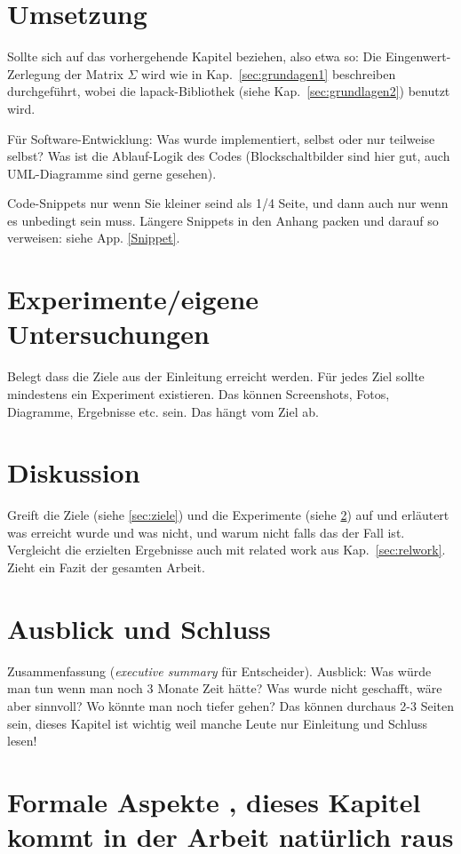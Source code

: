 \documentclass[12pt,oneside]{article}
\begin{document}
\section{Umsetzung}\label{sec:umsetzung}
Sollte sich auf das vorhergehende Kapitel beziehen, also etwa so:
Die Eingenwert-Zerlegung der Matrix $\Sigma$ wird wie in Kap.~\ref{sec:grundagen1} beschreiben durchgeführt, wobei die lapack-Bibliothek (siehe Kap.~\ref{sec:grundlagen2}) benutzt wird.

Für Software-Entwicklung: Was wurde implementiert, selbst oder nur teilweise selbst? Was ist die Ablauf-Logik des Codes (Blockschaltbilder sind hier gut, auch UML-Diagramme sind gerne gesehen).

Code-Snippets nur wenn Sie kleiner seind als 1/4 Seite, und dann auch nur wenn es unbedingt sein muss.
Längere Snippets in den Anhang packen und darauf so verweisen: siehe App. \ref{Snippet}.

\section{Experimente/eigene Untersuchungen}\label{sec:exp}
Belegt dass die Ziele aus der Einleitung erreicht werden. Für jedes Ziel sollte mindestens ein Experiment existieren. Das können Screenshots, Fotos, Diagramme, Ergebnisse etc. sein. Das hängt vom Ziel ab.

\section{Diskussion}
Greift die Ziele (siehe \ref{sec:ziele}) und die Experimente (siehe \ref{sec:exp}) auf und erläutert was erreicht wurde und was nicht, und warum nicht falls das der Fall ist. Vergleicht die erzielten Ergebnisse auch mit related work aus Kap.~\ref{sec:relwork}. Zieht ein Fazit der gesamten Arbeit.

\section{Ausblick und Schluss}
Zusammenfassung (\textit{executive summary} für Entscheider). Ausblick: Was würde man tun wenn man noch 3 Monate Zeit hätte? Was wurde nicht geschafft, wäre aber sinnvoll? Wo könnte man noch tiefer gehen? Das können durchaus 2-3 Seiten sein, dieses Kapitel ist wichtig weil manche Leute nur Einleitung und Schluss lesen!

\section{Formale Aspekte , dieses Kapitel kommt in der Arbeit natürlich raus}
%
\end{document}

